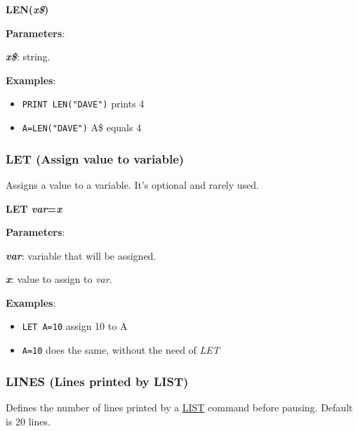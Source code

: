     \hspace{1.9cm}\textbf{LEN(\textit{x\$})}

    \textbf{Parameters}:

    \hspace{1cm}\textbf{\textit{x\$}}: string.

    \textbf{Examples}:
    \begin{itemize}
        \item \texttt{PRINT LEN("DAVE")} prints 4
        \item \texttt{A=LEN("DAVE")} A\$ equals 4
    \end{itemize}

    \subsubsection{{LET (Assign value to variable)}}
    \label{msbasic:lang:let}
    Assigns a value to a variable. It's optional and rarely used.

    \hspace{1.9cm}\textbf{LET \textit{var}=\textit{x}}

    \textbf{Parameters}:

    \hspace{1cm}\textbf{\textit{var}}: variable that will be assigned.

    \hspace{1cm}\textbf{\textit{x}}: value to assign to \textit{var}.

    \textbf{Examples}:
    \begin{itemize}
        \item \texttt{LET A=10} assign 10 to A
        \item \texttt{A=10} does the same, without the need of \textit{LET}
    \end{itemize}

    \subsubsection{{LINES (Lines printed by LIST)}}
    \label{msbasic:lang:lines}
    Defines the number of lines printed by a \hyperref[msbasic:lang:list]{LIST}
    command before pausing. Default is 20 lines.

